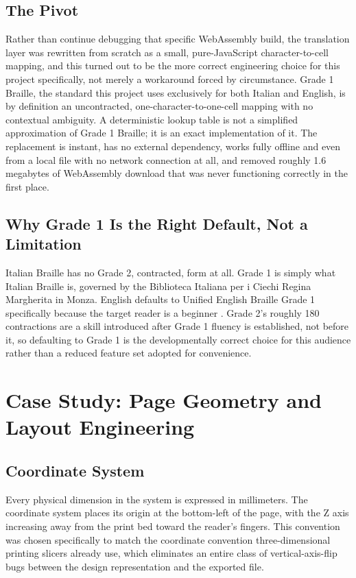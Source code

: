 \documentclass[conference]{IEEEtran}
\begin{document}
\subsection{The Pivot}

Rather than continue debugging that specific WebAssembly build, the translation layer was rewritten from scratch as a small, pure-JavaScript character-to-cell mapping, and this turned out to be the more correct engineering choice for this project specifically, not merely a workaround forced by circumstance. Grade 1 Braille, the standard this project uses exclusively for both Italian and English, is by definition an uncontracted, one-character-to-one-cell mapping with no contextual ambiguity. A deterministic lookup table is not a simplified approximation of Grade 1 Braille; it is an exact implementation of it. The replacement is instant, has no external dependency, works fully offline and even from a local file with no network connection at all, and removed roughly 1.6 megabytes of WebAssembly download that was never functioning correctly in the first place.

\subsection{Why Grade 1 Is the Right Default, Not a Limitation}

Italian Braille has no Grade 2, contracted, form at all. Grade 1 is simply what Italian Braille is, governed by the Biblioteca Italiana per i Ciechi Regina Margherita in Monza. English defaults to Unified English Braille Grade 1 specifically because the target reader is a beginner \cite{ueb}. Grade 2's roughly 180 contractions are a skill introduced after Grade 1 fluency is established, not before it, so defaulting to Grade 1 is the developmentally correct choice for this audience rather than a reduced feature set adopted for convenience.

\section{Case Study: Page Geometry and Layout Engineering}\label{sec:layout}

\subsection{Coordinate System}

Every physical dimension in the system is expressed in millimeters. The coordinate system places its origin at the bottom-left of the page, with the Z axis increasing away from the print bed toward the reader's fingers. This convention was chosen specifically to match the coordinate convention three-dimensional printing slicers already use, which eliminates an entire class of vertical-axis-flip bugs between the design representation and the exported file.
\end{document}
